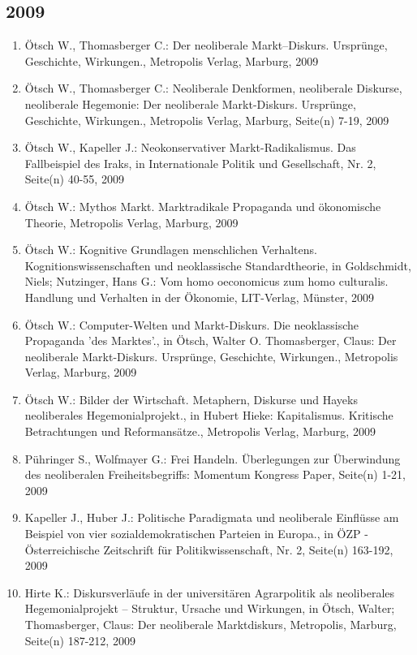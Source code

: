 \subsection*{2009}
\begin{enumerate}
    	 \item Ötsch W., Thomasberger C.: Der neoliberale Markt–Diskurs. Ursprünge, Geschichte, Wirkungen., Metropolis Verlag, Marburg, 2009
	 \item Ötsch W., Thomasberger C.: Neoliberale Denkformen, neoliberale Diskurse, neoliberale Hegemonie: Der neoliberale Markt-Diskurs. Ursprünge, Geschichte, Wirkungen., Metropolis Verlag, Marburg, Seite(n) 7-19, 2009
	 \item Ötsch W., Kapeller J.: Neokonservativer Markt-Radikalismus. Das Fallbeispiel des Iraks, in Internationale Politik und Gesellschaft, Nr. 2, Seite(n) 40-55, 2009
	 \item Ötsch W.: Mythos Markt. Marktradikale Propaganda und ökonomische Theorie, Metropolis Verlag, Marburg, 2009
	 \item Ötsch W.: Kognitive Grundlagen menschlichen Verhaltens. Kognitionswissenschaften und neoklassische Standardtheorie, in Goldschmidt, Niels; Nutzinger, Hans G.: Vom homo oeconomicus zum homo culturalis. Handlung und Verhalten in der Ökonomie, LIT-Verlag, Münster, 2009
	 \item Ötsch W.: Computer-Welten und Markt-Diskurs. Die neoklassische Propaganda 'des Marktes'., in Ötsch, Walter O. Thomasberger, Claus: Der neoliberale Markt-Diskurs. Ursprünge, Geschichte, Wirkungen., Metropolis Verlag, Marburg, 2009
	 \item Ötsch W.: Bilder der Wirtschaft. Metaphern, Diskurse und Hayeks neoliberales Hegemonialprojekt., in Hubert Hieke: Kapitalismus. Kritische Betrachtungen und Reformansätze., Metropolis Verlag, Marburg, 2009
	 \item Pühringer S., Wolfmayer G.: Frei Handeln. Überlegungen zur Überwindung des neoliberalen Freiheitsbegriffs: Momentum Kongress Paper, Seite(n) 1-21, 2009
	 \item Kapeller J., Huber J.: Politische Paradigmata und neoliberale Einflüsse am Beispiel von vier sozialdemokratischen Parteien in Europa., in ÖZP - Österreichische Zeitschrift für Politikwissenschaft, Nr. 2, Seite(n) 163-192, 2009
	 \item Hirte K.: Diskursverläufe in der universitären Agrarpolitik als neoliberales Hegemonialprojekt – Struktur, Ursache und Wirkungen, in Ötsch, Walter; Thomasberger, Claus: Der neoliberale Marktdiskurs, Metropolis, Marburg, Seite(n) 187-212, 2009

\end{enumerate}
